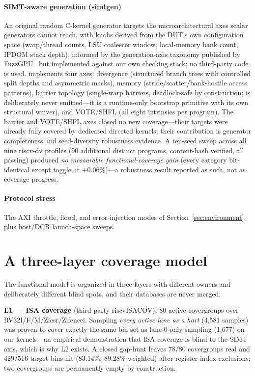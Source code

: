 \documentclass[review,12pt]{elsarticle}
\newcommand{\code}[1]{\texttt{\detokenize{#1}}}
\begin{document}
\paragraph{SIMT-aware generation (simtgen)} An original random
C-kernel generator targets the microarchitectural axes scalar
generators cannot reach, with knobs derived from the DUT's own
configuration space (warp/thread counts, LSU coalescer window,
local-memory bank count, IPDOM stack depth), informed by the
generation-axis taxonomy published by FuzzGPU~\cite{fuzzgpu} but
implemented against our own checking stack; no third-party code is
used. \code{simtgen} implements four axes: divergence (structured
branch trees with controlled split depths and asymmetric masks),
memory (stride/scatter/bank-hostile access patterns), barrier
topology (single-warp barriers, deadlock-safe by construction;
\code{wspawn} is deliberately never emitted---it is a runtime-only
bootstrap primitive with its own structural waiver), and VOTE/SHFL
(all eight intrinsics per program). The barrier and VOTE/SHFL axes
closed no new coverage---their targets were already fully covered by
dedicated directed kernels; their contribution is generator
completeness and seed-diversity robustness evidence. A ten-seed
sweep across all nine riscv-dv profiles (90 additional distinct
programs, content-hash verified, all passing) produced \emph{no
	measurable functional-coverage gain} (every category bit-identical
except toggle at $+0.06\%$)---a robustness result reported as such,
not as coverage progress.

\paragraph{Protocol stress} The AXI throttle, flood, and
error-injection modes of Section~\ref{sec:environment}, plus
host/DCR launch-space sweeps.

\section{A three-layer coverage model}
\label{sec:coverage}
The functional model is organized in three layers with different
owners and deliberately different blind spots, and their databases
are never merged:

\textbf{L1 --- ISA coverage} (third-party riscvISACOV): 80 active
covergroups over RV32I/F/M/Zicsr/Zifencei. Sampling \emph{every
	active lane as a hart} (4{,}581 samples) was proven to cover exactly
the same bin set as lane-0-only sampling (1{,}677) on our
kernels---an empirical demonstration that ISA coverage is blind to
the SIMT axis, which is why L2 exists. A closed gap-hunt leaves 78/80
covergroups real and 429/516 target bins hit (83.14\%; 89.28\%
weighted) after register-index exclusions; two covergroups are
permanently empty by construction.
\end{document}
